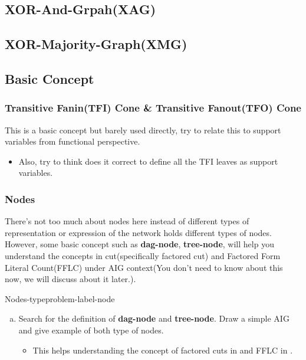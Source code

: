 \documentclass[main.tex]{subfiles}
\begin{document}
\subsection{XOR-And-Grpah(XAG)}

\subsection{XOR-Majority-Graph(XMG)}

\subsection{Basic Concept}
\subsubsection{Transitive Fanin(TFI) Cone \& Transitive Fanout(TFO) Cone}
This is a basic concept but barely used directly, try to relate this to support variables from functional perspective.
\begin{itemize}
    \item Also, try to think does it correct to define all the TFI leaves as support variables.
\end{itemize}

\subsubsection{Nodes}
There's not too much about nodes here instead of different types of representation or expression of the network holds different types of nodes. However, some basic concept such as \textbf{dag-node}, \textbf{tree-node}, will help you understand the concepts in cut(specifically factored cut) and Factored Form Literal Count(FFLC) under AIG context(You don't need to know about this now, we will discuss about it later.).
\begin{problem}{Nodes-type}{problem-label-node}
\begin{enumerate}[(a)]
    \item Search for the definition of \textbf{dag-node} and \textbf{tree-node}. Draw a simple AIG and give example of both type of nodes.
    \begin{itemize}
        \item This helps understanding the concept of factored cuts in \cite{FactoredCuts} and FFLC in \cite{FFLC}.
    \end{itemize}
    \end{enumerate}
\end{problem}
\vspace*{4\baselineskip}
\end{document}
